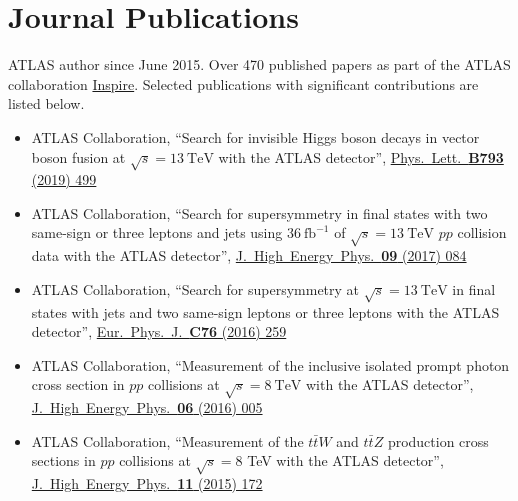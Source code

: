 \documentclass[a4paper,10pt]{article}
\begin{document}
\section{Journal Publications}
{ATLAS author since June 2015. Over 470 published papers as part of the ATLAS collaboration \href{https://inspirehep.net/authors/1307536}{Inspire}. Selected publications with significant contributions are listed below.}
\begin{itemize}
	\item ATLAS Collaboration,
	``Search for invisible Higgs boson decays in vector boson fusion at $\sqrt{s}=13\ \mathrm{TeV}$ with the ATLAS detector'',
	\href{https://www.sciencedirect.com/science/article/pii/S0370269319302564}{Phys.\ Lett.\ {\bf B793} (2019) 499}
	\item ATLAS Collaboration,
	``Search for supersymmetry in final states with two same-sign or three leptons and jets using $36\ \mathrm{fb}^{-1}$ of $\sqrt{s}=13\ \mathrm{TeV}$ $pp$ collision data with the ATLAS detector'',
	\href{https://link.springer.com/article/10.1007/JHEP09(2017)084}{J.\ High\ Energy\ Phys.\ {\bf 09} (2017) 084}
	\item ATLAS Collaboration,
	``Search for supersymmetry at $\sqrt{s}=13\ \mathrm{TeV}$ in final states with jets and two same-sign leptons or three leptons with the ATLAS detector'',
	\href{https://link.springer.com/article/10.1140/epjc/s10052-016-4095-8}{Eur.\ Phys.\ J.\ {\bf C76} (2016) 259}
	\item ATLAS Collaboration,
	``Measurement of the inclusive isolated prompt photon cross section in $pp$ collisions at $\sqrt{s}=8\ \mathrm{TeV}$ with the ATLAS detector'',
	\href{https://link.springer.com/article/10.1007/JHEP08(2016)005}{J.\ High\ Energy\ Phys.\ {\bf 06} (2016) 005 }
	\item ATLAS Collaboration,
	``Measurement of the $t\bar{t}W$ and $t\bar{t}Z$ production cross sections in $pp$ collisions at $\sqrt{s} = 8$ TeV with the ATLAS detector'',
	\href{https://link.springer.com/article/10.1007/JHEP08(2016)005}{J.\ High\ Energy\ Phys.\ {\bf 11} (2015) 172 }

\end{itemize}


\vspace{3mm}
\end{document}
